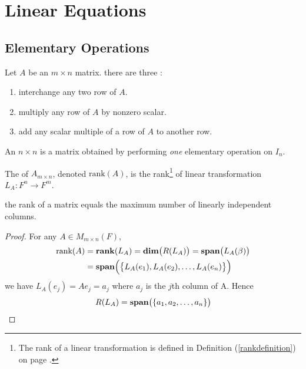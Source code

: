 \section{Linear Equations}

\subsection{Elementary Operations}

\begin{definition}
	Let $A$ be an $m\times n$ matrix. there are three :
	\begin{enumerate}
		\item interchange any two row of $A$.
		\item multiply any row of $A$ by nonzero scalar.
		\item add any scalar multiple of a row of $A$ to another row.
	\end{enumerate}
\end{definition}

\begin{definition}
	An $n\times n$  is a matrix obtained by performing \emph{one} elementary operation on $I_n$.
\end{definition}

\begin{definition}
	The  of $A_{m \times n}$, denoted $\text{rank}(A)$, is the rank\footnote{The rank of a linear transformation is defined in Definition (\ref{rankdefinition}) on page \pageref{rankdefinition}.} of linear transformation $L_A: F^n \rightarrow F^m$.
\end{definition}

\begin{theorem}
	the rank of a matrix equals the maximum number of linearly independent columns.
\end{theorem}
\begin{proof}
	For any $A \in M_{m\times n}(F)$, 
	\begin{equation*}
		\begin{aligned}
			\text{rank}(A) &= \rank{L_A} = \dimension{R(L_A)} = \vectorspan{L_A(\beta)} \\
			&= \vectorspan{\set{ L_A(e_1), L_A(e_2), \dots, L_A(e_n) }}
		\end{aligned}
	\end{equation*}
	we have $L_A(e_j) = A e_j = a_j$ where $a_j$ is the $j$th column of A. Hence
	\begin{equation*}
		R(L_A) = \vectorspan{\set{ a_1, a_2, \dots, a_n}}
	\end{equation*}
\end{proof}

